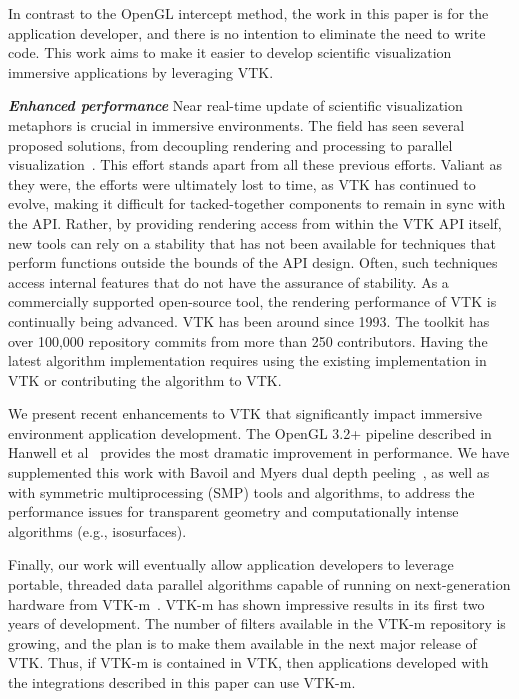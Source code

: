 In contrast to the OpenGL intercept method, the work in this paper is for the application developer, and there is no intention to eliminate the need to write code. This work aims to make  it easier to develop scientific visualization immersive applications by leveraging VTK.

\textit{\textbf{Enhanced performance}} Near real-time update of scientific visualization metaphors is crucial in immersive environments.
The field has seen several proposed solutions, from decoupling rendering and processing to parallel visualization~\cite{Bryson:1996, van2000vista}.
This effort stands apart from all these previous efforts. Valiant
as they were, the efforts were ultimately lost to time, as VTK has continued to
evolve, making it difficult for tacked-together components to remain in
sync with the API.
Rather, by providing rendering access from within the VTK API itself, new
tools can rely on a stability that has not been available for techniques
that perform functions outside the bounds of the API design. Often, such techniques access
internal features that do not have the assurance of stability.
As a commercially supported open-source tool, the rendering performance of VTK is
continually being advanced.
VTK has been around since 1993. The toolkit has over 100,000 repository commits from more than 250 contributors.
Having the latest algorithm implementation requires using the existing implementation in VTK or contributing the algorithm to VTK.

We present recent enhancements to VTK that significantly impact immersive
environment application development. The OpenGL 3.2+ pipeline described in Hanwell et al~\cite{Hanwell:2015} provides the most dramatic improvement in performance. We have supplemented this work with Bavoil and Myers dual depth peeling~\cite{Bavoil:2008}, as well as with symmetric multiprocessing (SMP) tools and algorithms, to address the performance issues for transparent geometry and computationally intense algorithms (e.g., isosurfaces).

Finally, our work will eventually allow application developers to leverage portable, threaded data parallel algorithms capable of running on next-generation hardware from VTK-m~\cite{Moreland:2016}. VTK-m has shown impressive results in its first two years of development. The number of filters available in the VTK-m repository is growing, and the plan is to make them available in the next major release of VTK. Thus, if VTK-m is contained in VTK, then applications developed with the integrations described in this paper can use VTK-m.
